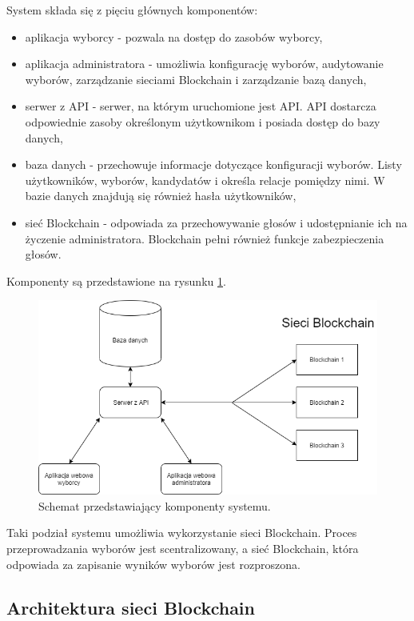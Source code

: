 \documentclass[a4paper,12pt]{book}
\begin{document}
System składa się z pięciu głównych komponentów:

\begin {itemize}
	\item aplikacja wyborcy - pozwala na dostęp do zasobów wyborcy,
	\item aplikacja administratora - umożliwia konfigurację wyborów, audytowanie wyborów, zarządzanie sieciami Blockchain i zarządzanie bazą danych,
	\item serwer z API - serwer, na którym uruchomione jest API. API dostarcza odpowiednie zasoby określonym użytkownikom i posiada dostęp do bazy danych,
	\item baza danych - przechowuje informacje dotyczące konfiguracji wyborów. Listy użytkowników, wyborów, kandydatów i określa relacje pomiędzy nimi. W bazie danych znajdują się również hasła użytkowników,
	\item sieć Blockchain - odpowiada za przechowywanie głosów i udostępnianie ich na życzenie administratora. Blockchain pełni również funkcje zabezpieczenia głosów.
\end {itemize}

Komponenty są przedstawione na rysunku \ref{komponenty}.

\begin{figure}[H]
    	\centering
	\includegraphics[width=\textwidth]{images/modules.png}
	\caption{Schemat przedstawiający komponenty systemu.}\label{komponenty}
\end {figure}

Taki podział systemu umożliwia wykorzystanie sieci Blockchain. Proces przeprowadzania wyborów jest scentralizowany, a sieć Blockchain, która odpowiada za zapisanie wyników wyborów jest rozproszona.
 
\subsection{Architektura sieci Blockchain}
 
\end{document}
